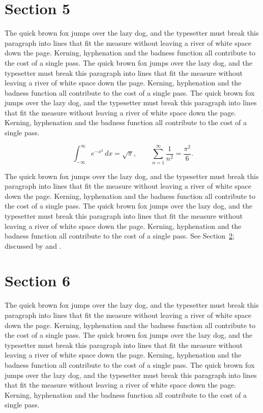 \documentclass{article}
\begin{document}
\section{Section 5}
\label{sec:5}
The quick brown fox jumps over the lazy dog, and the typesetter must break this paragraph into lines that fit the measure without leaving a river of white space down the page. Kerning, hyphenation and the badness function all contribute to the cost of a single pass. The quick brown fox jumps over the lazy dog, and the typesetter must break this paragraph into lines that fit the measure without leaving a river of white space down the page. Kerning, hyphenation and the badness function all contribute to the cost of a single pass. The quick brown fox jumps over the lazy dog, and the typesetter must break this paragraph into lines that fit the measure without leaving a river of white space down the page. Kerning, hyphenation and the badness function all contribute to the cost of a single pass. 

\begin{equation}\label{eq:5}
\int_{-\infty}^{\infty} e^{-x^{2}}\,dx = \sqrt{\pi}, \qquad
\sum_{n=1}^{\infty} \frac{1}{n^{2}} = \frac{\pi^{2}}{6}.
\end{equation}

The quick brown fox jumps over the lazy dog, and the typesetter must break this paragraph into lines that fit the measure without leaving a river of white space down the page. Kerning, hyphenation and the badness function all contribute to the cost of a single pass. The quick brown fox jumps over the lazy dog, and the typesetter must break this paragraph into lines that fit the measure without leaving a river of white space down the page. Kerning, hyphenation and the badness function all contribute to the cost of a single pass. 
See Section~\ref{sec:6}; discussed by \textcite{k1} and \textcite{l3}.
\section{Section 6}
\label{sec:6}
The quick brown fox jumps over the lazy dog, and the typesetter must break this paragraph into lines that fit the measure without leaving a river of white space down the page. Kerning, hyphenation and the badness function all contribute to the cost of a single pass. The quick brown fox jumps over the lazy dog, and the typesetter must break this paragraph into lines that fit the measure without leaving a river of white space down the page. Kerning, hyphenation and the badness function all contribute to the cost of a single pass. The quick brown fox jumps over the lazy dog, and the typesetter must break this paragraph into lines that fit the measure without leaving a river of white space down the page. Kerning, hyphenation and the badness function all contribute to the cost of a single pass. 
\end{document}
